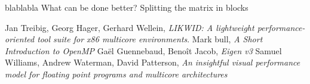 \documentclass[11pt,a4paper,oneside,titlepage,openright]{book}
\begin{document}
blablabla
What can be done better? Splitting the matrix in blocks 

\begin{thebibliography}{1}
Jan Treibig, Georg Hager, Gerhard Wellein, \textit{LIKWID: A lightweight performance-oriented tool suite for x86 multicore environments}. 
Mark bull, \textit{A Short Introduction to OpenMP}
Ga\"{e}l Guennebaud, Beno\^{i}t Jacob, \textit{Eigen v3}
Samuel Williams, Andrew Waterman, David Patterson, \textit{An insightful visual performance model for floating point programs and multicore architectures}
\end{thebibliography}
 
 
 
 
 
\end{document}
